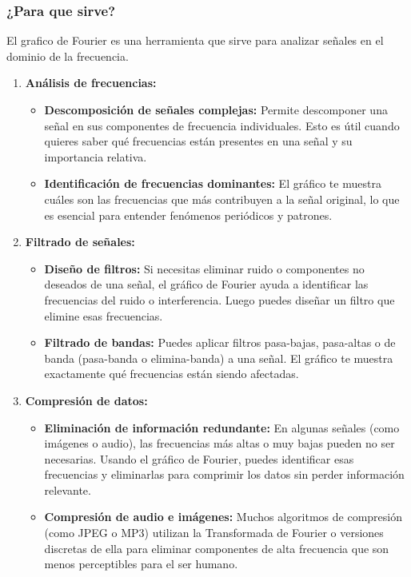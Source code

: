 \documentclass{article}
\begin{document}
\subsubsection{¿Para que sirve?}
El grafico de Fourier es una herramienta que sirve para analizar señales en el dominio de la frecuencia.
\begin{enumerate}
    \item \textbf{Análisis de frecuencias:}
    \begin{itemize}
        \item \textbf{Descomposición de señales complejas:} Permite descomponer una señal en sus componentes de frecuencia individuales. Esto es útil cuando quieres saber qué frecuencias están presentes en una señal y su importancia relativa.
    
        \item \textbf{Identificación de frecuencias dominantes:} El gráfico te muestra cuáles son las frecuencias que más contribuyen a la señal original, lo que es esencial para entender fenómenos periódicos y patrones.
    \end{itemize}
    \item \textbf{Filtrado de señales:}
    \begin{itemize}
        \item \textbf{Diseño de filtros:} Si necesitas eliminar ruido o componentes no deseados de una señal, el gráfico de Fourier ayuda a identificar las frecuencias del ruido o interferencia. Luego puedes diseñar un filtro que elimine esas frecuencias.
    
        \item \textbf{Filtrado de bandas:} Puedes aplicar filtros pasa-bajas, pasa-altas o de banda (pasa-banda o elimina-banda) a una señal. El gráfico te muestra exactamente qué frecuencias están siendo afectadas.
    \end{itemize}
    
    \item \textbf{Compresión de datos:}
    \begin{itemize}
        \item \textbf{ Eliminación de información redundante:} En algunas señales (como imágenes o audio), las frecuencias más altas o muy bajas pueden no ser necesarias. Usando el gráfico de Fourier, puedes identificar esas frecuencias y eliminarlas para comprimir los datos sin perder información relevante.
    
        \item \textbf{Compresión de audio e imágenes:} Muchos algoritmos de compresión (como JPEG o MP3) utilizan la Transformada de Fourier o versiones discretas de ella para eliminar componentes de alta frecuencia que son menos perceptibles para el ser humano.
    \end{itemize}
    

\end{enumerate}
\end{document}
